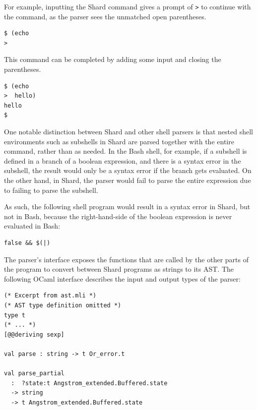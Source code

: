 \documentclass[oneside]{report}
\begin{document}
For example, inputting the Shard command gives a prompt of \texttt{>} to continue with the command, as the parser sees the unmatched open parentheses.

\begin{minipage}[c]{\textwidth-15pt}
  \begin{lstlisting}[language=shard]
$ (echo
>
\end{lstlisting}
  \smallskip
\end{minipage}

This command can be completed by adding some input and closing the parentheses.

\begin{minipage}[c]{\textwidth-15pt}
  \begin{lstlisting}[language=shard]
$ (echo
>  hello)
hello
$
\end{lstlisting}
  \smallskip
\end{minipage}

One notable distinction between Shard and other shell parsers is that nested shell environments such as subshells in Shard are parsed together with the entire command, rather than as needed.
In the Bash shell, for example, if a subshell is defined in a branch of a boolean expression, and there is a syntax error in the subshell, the result would only be a syntax error if the branch gets evaluated.
On the other hand, in Shard, the parser would fail to parse the entire expression due to failing to parse the subshell.

As such, the following shell program would result in a syntax error in Shard, but not in Bash, because the right-hand-side of the boolean expression is never evaluated in Bash:

\begin{minipage}[c]{\textwidth-15pt}
  \begin{lstlisting}[language=shard]
false && $(|)
\end{lstlisting}
  \smallskip
\end{minipage}

The parser's interface exposes the functions that are called by the other parts of the program to convert between Shard programs as strings to its AST. The following OCaml interface describes the input and output types of the parser:

\begin{minipage}[c]{\textwidth-15pt}
  \begin{lstlisting}
(* Excerpt from ast.mli *)
(* AST type definition omitted *)
type t
(* ... *)
[@@deriving sexp]

val parse : string -> t Or_error.t

val parse_partial
  :  ?state:t Angstrom_extended.Buffered.state
  -> string
  -> t Angstrom_extended.Buffered.state
\end{lstlisting}
  \smallskip
\end{minipage}
\end{document}
